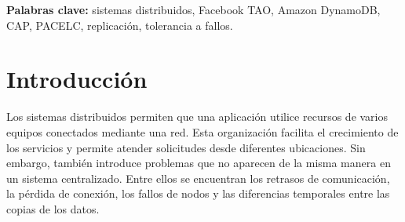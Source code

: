 \documentclass[12pt,a4paper]{article}
\begin{document}
\begin{abstract}
\noindent
Este informe estudia Facebook TAO como sistema distribuido de almacenamiento para el grafo social de Meta y lo compara con Amazon DynamoDB. El análisis considera las transparencias de distribución, los principios CAP y PACELC, los modelos de comunicación y la tolerancia a fallos. TAO organiza la información mediante objetos y asociaciones, mientras que DynamoDB ofrece un servicio NoSQL administrado basado en tablas y claves. La comparación permite observar que ambos sistemas buscan atender grandes volúmenes de solicitudes, aunque responden a necesidades diferentes. Para complementar la investigación se realizó una experimentación con DynamoDB Local, Docker y AWS CLI. Se creó una tabla, se insertó y consultó información, y se verificaron operaciones de modificación y eliminación. También se detuvo y reinició el contenedor. Después del reinicio, el servicio volvió a ejecutarse, pero la tabla creada anteriormente ya no estaba disponible. Este resultado corresponde a la configuración local utilizada y no representa una prueba del comportamiento del servicio administrado de AWS. Finalmente, se examinan las ventajas y limitaciones de cada propuesta y se explica por qué la elección de un sistema distribuido debe considerar el tipo de datos, las operaciones requeridas y las condiciones de disponibilidad y consistencia.
\end{abstract}

\vspace{0.5cm}

\noindent\textbf{Palabras clave:} sistemas distribuidos, Facebook TAO, Amazon DynamoDB, CAP, PACELC, replicación, tolerancia a fallos.

\newpage

\section{Introducción}

Los sistemas distribuidos permiten que una aplicación utilice recursos de varios equipos conectados mediante una red. Esta organización facilita el crecimiento de los servicios y permite atender solicitudes desde diferentes ubicaciones. Sin embargo, también introduce problemas que no aparecen de la misma manera en un sistema centralizado. Entre ellos se encuentran los retrasos de comunicación, la pérdida de conexión, los fallos de nodos y las diferencias temporales entre las copias de los datos.
\end{document}
